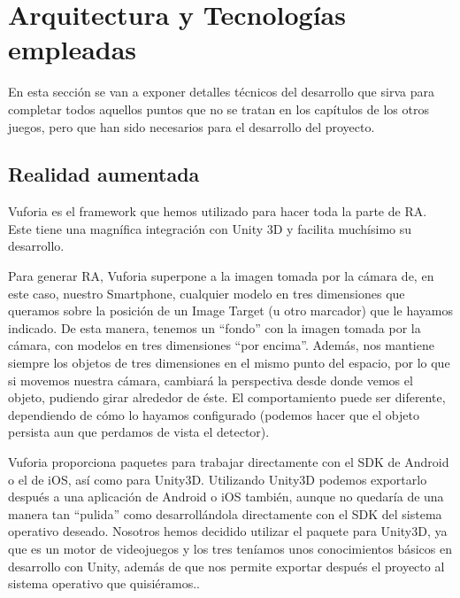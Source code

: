 %
%
\chapter{Arquitectura y Tecnologías empleadas}

En esta sección se van a exponer detalles técnicos del desarrollo que sirva para completar todos aquellos puntos que no se tratan en los capítulos de los otros juegos, pero que han sido necesarios para el desarrollo del proyecto.

\section{Realidad aumentada}
\label{cap4:sec:ra}

Vuforia es el framework que hemos utilizado para hacer toda la parte de RA. Este tiene una magnífica integración con Unity 3D y facilita muchísimo su desarrollo.

Para generar RA, Vuforia superpone a la imagen tomada por la cámara de, en este caso, nuestro Smartphone, cualquier modelo en tres dimensiones que queramos sobre la posición de un Image Target (u otro marcador) que le hayamos indicado. De esta manera, tenemos un ``fondo'' con la imagen tomada por la cámara, con modelos en tres dimensiones ``por encima''. Además, nos mantiene siempre los objetos de tres dimensiones en el mismo punto del espacio, por lo que si movemos nuestra cámara, cambiará la perspectiva desde donde vemos el objeto, pudiendo girar alrededor de éste. El comportamiento puede ser diferente, dependiendo de cómo lo hayamos configurado (podemos hacer que el objeto persista aun que perdamos de vista el detector).

Vuforia proporciona paquetes para trabajar directamente con el SDK de Android o el de iOS, así como para Unity3D. Utilizando Unity3D podemos exportarlo después a una aplicación de Android o iOS también, aunque no quedaría de una manera tan ``pulida'' como desarrollándola directamente con el SDK del sistema operativo deseado. Nosotros hemos decidido utilizar el paquete para Unity3D, ya que es un motor de videojuegos y los tres teníamos unos conocimientos básicos en desarrollo con Unity, además de que nos permite exportar después el proyecto al sistema operativo que quisiéramos..

